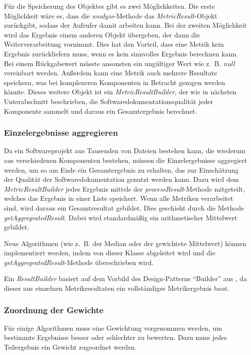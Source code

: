 Für die Speicherung des Objektes gibt es zwei Möglichkeiten. Die erste Möglichkeit wäre es, dass die \textit{analyze}-Methode das \textit{MetricResult}-Objekt zurückgibt, sodass der Aufrufer damit arbeiten kann. Bei der zweiten Möglichkeit wird das Ergebnis einem anderen Objekt übergeben, der dann die Weiterverarbeitung vornimmt. Dies hat den Vorteil, dass eine Metrik kein Ergebnis zurückliefern muss, wenn es kein sinnvolles Ergebnis berechnen kann. Bei einem Rückgabewert müsste ansonsten ein ungültiger Wert wie z.~B. \textit{null} vereinbart werden. Außerdem kann eine Metrik auch mehrere Resultate speichern, was bei komplexeren Komponenten in Betracht gezogen werden könnte. Dieses weitere Objekt ist ein  \textit{MetricResultBuilder}, der wie in nächsten Unterabschnitt beschrieben, die Softwaredokumentationsqualität jeder Komponente sammelt und daraus ein Gesamtergebnis berechnet.  

\subsubsection{Einzelergebnisse aggregieren}
Da ein Softwareprojekt aus Tausenden von Dateien bestehen kann, die wiederum aus verschiedenen Komponenten bestehen, müssen die Einzelergebnisse aggregiert werden, um so am Ende ein Gesamtergebnis zu erhalten, das zur Einschätzung der Qualität der Softwaredokumentation genutzt werden kann. Dazu wird dem \textit{MetricResultBuilder} jedes Ergebnis mittels der \textit{processResult}-Methode mitgeteilt, welches das Ergebnis in einer Liste speichert. Wenn alle Metriken verarbeitet sind, wird daraus ein Gesamtresultat gebildet. Dies geschieht durch die Methode \textit{getAggregratedResult}. Dabei wird standardmäßig ein arithmetischer Mittelwert gebildet.

Neue Algorithmen (wie z.~B. der Median oder der gewichtete Mittelwert) können implementiert werden, indem von dieser Klasse abgeleitet wird und die \textit{getAggregratedResult}-Methode überschrieben wird. 

Ein \textit{ResultBuilder} basiert auf dem Vorbild des Design-Patterns \enquote{Builder} aus \cite[S. 139-149]{gamma2015design}, da dieser aus einzelnen Metrikresultaten ein vollständiges Metrikergebnis baut.


 
\subsubsection{Zuordnung der Gewichte}\label{chapter_weights_assign}
Für einige Algorithmen muss eine Gewichtung vorgenommen werden, um bestimmte Ergebnisse besser oder schlechter zu bewerten. Dazu muss jedes Teilergebnis ein Gewicht zugeordnet werden. 

